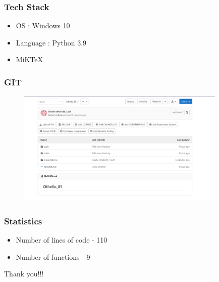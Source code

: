 \documentclass[14pt]{beamer}
\begin{document}
\begin{frame}
    \frametitle {Tech Stack}
     \begin{itemize}
         \item OS : Windows 10
          \item Language : Python 3.9
           \item MiKTeX
       \end{itemize}
\end{frame}
   
  \begin{frame}
      \frametitle{GIT}
         \begin{figure}
             \includegraphics [width = 10cm] {repository.png}
         \end{figure}
      \end{frame}
 \begin{frame}
    \frametitle {Statistics}
      \begin {itemize}
        \item Number of lines of code - 110
         \item Number of functions - 9
        \end {itemize}
\end{frame}
    \begin{frame}
	\begin{center}
	     Thank you!!!
	\end{center}
    \end{frame}
\end{document}
